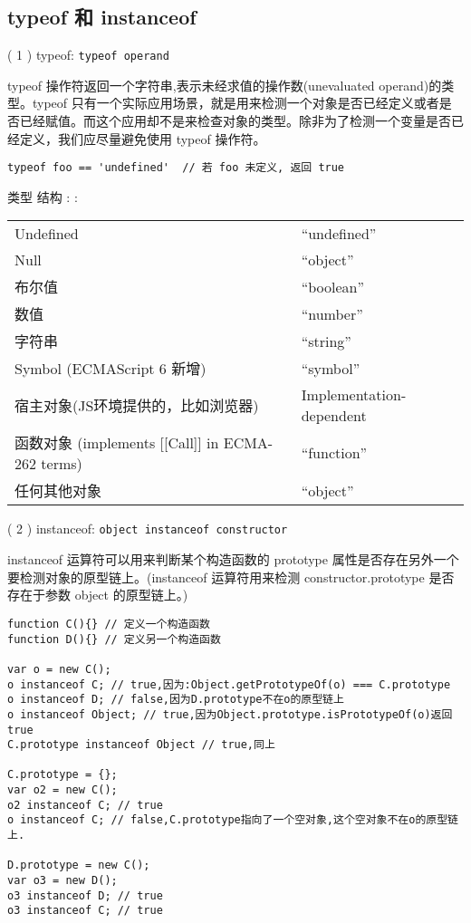 \subsection{typeof 和 instanceof}\hypertarget{typeof--instanceof}{}\label{typeof--instanceof}

( 1 ) typeof: \texttt{typeof operand}

typeof 操作符返回一个字符串,表示未经求值的操作数(unevaluated operand)的类型。typeof 只有一个实际应用场景，就是用来检测一个对象是否已经定义或者是否已经赋值。而这个应用却不是来检查对象的类型。除非为了检测一个变量是否已经定义，我们应尽量避免使用 typeof 操作符。

\begin{verbatim}typeof foo == 'undefined'  // 若 foo 未定义, 返回 true
\end{verbatim}

类型      \textbar{} 结构
:
      \textbar{} :

\begin{longtable}{|l|l|}   %
\hline
Undefined & ``undefined''\\
Null & ``object''\\
布尔值 & ``boolean''\\
数值 & ``number''\\
字符串 & ``string''\\
Symbol (ECMAScript 6 新增) & ``symbol''\\
宿主对象(JS环境提供的，比如浏览器) & Implementation-dependent\\
函数对象 (implements [[Call]] in ECMA-262 terms) & ``function''\\
任何其他对象 & ``object''\\
\hline
\end{longtable}   %

( 2 ) instanceof: \texttt{object instanceof constructor}

instanceof 运算符可以用来判断某个构造函数的 prototype 属性是否存在另外一个要检测对象的原型链上。(instanceof 运算符用来检测 constructor.prototype 是否存在于参数 object 的原型链上。)

\begin{verbatim}function C(){} // 定义一个构造函数
function D(){} // 定义另一个构造函数

var o = new C();
o instanceof C; // true,因为:Object.getPrototypeOf(o) === C.prototype
o instanceof D; // false,因为D.prototype不在o的原型链上
o instanceof Object; // true,因为Object.prototype.isPrototypeOf(o)返回true
C.prototype instanceof Object // true,同上

C.prototype = {};
var o2 = new C();
o2 instanceof C; // true
o instanceof C; // false,C.prototype指向了一个空对象,这个空对象不在o的原型链上.

D.prototype = new C();
var o3 = new D();
o3 instanceof D; // true
o3 instanceof C; // true
\end{verbatim}

